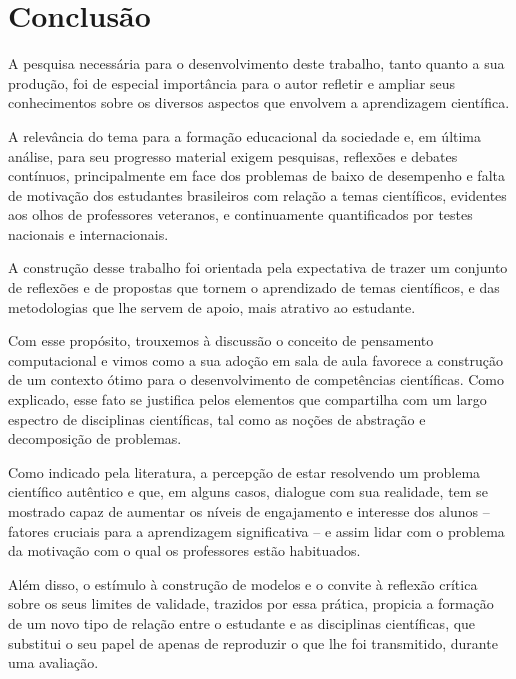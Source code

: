 \chapter*[Conclusão]{Conclusão}

A pesquisa necessária para o desenvolvimento deste trabalho, tanto quanto a sua produção, foi de especial importância para o autor refletir e ampliar seus conhecimentos sobre os diversos aspectos que envolvem a aprendizagem científica. 

A relevância do tema para a formação educacional da sociedade e, em última análise, para seu progresso material exigem pesquisas, reflexões e debates contínuos, principalmente em face dos problemas de baixo de desempenho e falta de motivação dos estudantes brasileiros com relação a temas científicos, evidentes aos olhos de professores veteranos, e continuamente quantificados por testes nacionais e internacionais. 

A construção desse trabalho foi orientada pela expectativa de trazer um conjunto de reflexões e de propostas que tornem o aprendizado de temas científicos, e das metodologias que lhe servem de apoio, mais atrativo ao estudante. 

Com esse propósito, trouxemos à discussão o conceito de pensamento computacional e vimos como a sua adoção em sala de aula favorece a construção de um contexto ótimo para o desenvolvimento de competências científicas. Como explicado, esse fato se justifica pelos elementos que compartilha com um largo espectro de disciplinas científicas, tal como as noções de abstração e decomposição de problemas.

Como indicado pela literatura, a percepção de estar resolvendo um problema científico autêntico e que, em alguns casos, dialogue com sua realidade, tem se mostrado capaz de aumentar os níveis de engajamento e interesse dos alunos -- fatores cruciais para a aprendizagem significativa -- e assim lidar com o problema da motivação com o qual os professores estão habituados.

Além disso, o estímulo à construção de modelos e o convite à reflexão crítica sobre os seus limites de validade, trazidos por essa prática, propicia a formação de um novo tipo de relação entre o estudante e as disciplinas científicas, que substitui o seu papel de apenas de reproduzir o que lhe foi transmitido, durante uma avaliação.

